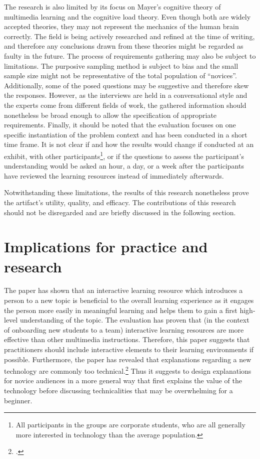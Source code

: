 The research is also limited by its focus on Mayer's cognitive theory of multimedia learning and the cognitive load theory. Even though both are widely accepted theories, they may not represent the mechanics of the human brain correctly. The field is being actively researched and refined at the time of writing, and therefore any conclusions drawn from these theories might be regarded as faulty in the future. The process of requirements gathering may also be subject to limitations. The purposive sampling method is subject to bias and the small sample size might not be representative of the total population of \enquote{novices}. Additionally, some of the posed questions may be suggestive and therefore skew the responses. However, as the interviews are held in a conversational style and the experts come from different fields of work, the gathered information should nonetheless be broad enough to allow the specification of appropriate requirements. Finally, it should be noted that the evaluation focuses on one specific instantiation of the problem context and has been conducted in a short time frame. It is not clear if and how the results would change if conducted at an exhibit, with other participants\footnote{All participants in the groups are corporate students, who are all generally more interested in technology than the average population.}, or if the questions to assess the participant's understanding would be asked an hour, a day, or a week after the participants have reviewed the learning resources instead of immediately afterwards.

Notwithstanding these limitations, the results of this research nonetheless prove the artifact's utility, quality, and efficacy. The contributions of this research should not be disregarded and are briefly discussed in the following section. 

\section{Implications for practice and research} \label{Implications}
The paper has shown that an interactive learning resource which introduces a person to a new topic is beneficial to the overall learning experience as it engages the person more easily in meaningful learning and helps them to gain a first high-level understanding of the topic. The evaluation has proven that (in the context of onboarding new students to a team) interactive learning resources are more effective than other multimedia instructions. Therefore, this paper suggests that practitioners should include interactive elements to their learning environments if possible. Furthermore, the paper has revealed that explanations regarding a new technology are commonly too technical.\footcite[Cf.][]{DanielKaltenbach_Interview} Thus it suggests to design explanations for novice audiences in a more general way that first explains the value of the technology before discussing technicalities that may be overwhelming for a beginner.

